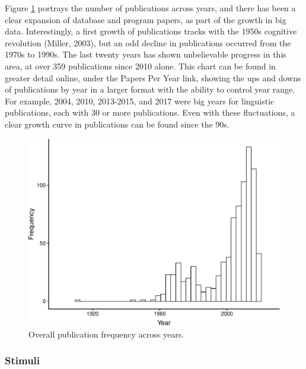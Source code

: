 \documentclass[english,,man]{apa6}
\theoremstyle{definition}
\theoremstyle{definition}
\theoremstyle{definition}
\theoremstyle{remark}
\begin{document}
Figure \ref{fig:pub-fig} portrays the number of publications across
years, and there has been a clear expansion of database and program
papers, as part of the growth in big data. Interestingly, a first growth
of publications tracks with the 1950s cognitive revolution (Miller,
2003), but an odd decline in publications occurred from the 1970s to
1990s. The last twenty years has shown unbelievable progress in this
area, at over 359 publications since 2010 alone. This chart can be found
in greater detail online, under the Papers Per Year link, showing the
ups and downs of publications by year in a larger format with the
ability to control year range. For example, 2004, 2010, 2013-2015, and
2017 were big years for linguistic publications, each with 30 or more
publications. Even with these fluctuations, a clear growth curve in
publications can be found since the 90s.

\begin{figure}
\centering
\includegraphics{LAB_files/figure-latex/pub-fig-1.pdf}
\caption{\label{fig:pub-fig}Overall publication frequency across years.}
\end{figure}

\hypertarget{stimuli}{%
\subsubsection{Stimuli}\label{stimuli}}
\end{document}
